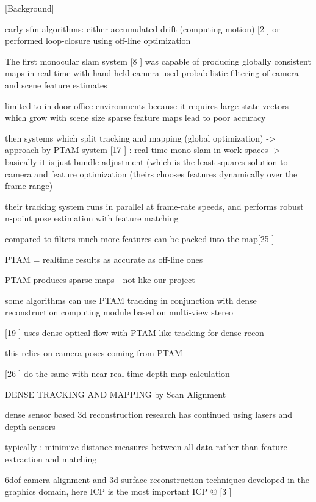 [Background]

early sfm algorithms: either accumulated drift (computing motion) [2 \cite{Beardsley97Sequential} ] or performed loop-closure using off-line optimization 

The first monocular slam system [8 \cite{Davison03Real} ] was capable of producing globally consistent maps in real time with hand-held camera used probabilistic filtering of camera and scene feature estimates

limited to in-door office environments because it requires large state vectors which grow with scene size
sparse feature maps lead to poor accuracy

then systems which split tracking and mapping (global optimization) -> approach by PTAM system [17 \cite{Klein07Parallel}]
: real time mono slam in work spaces -> basically it is just bundle adjustment (which is the least squares solution to camera and feature optimization (theirs chooses features dynamically over the frame range)

their tracking system runs in parallel at frame-rate speeds, and performs robust n-point pose estimation with feature matching

compared to filters much more features can be packed into the map[25 \cite{Strasdat10Real} ]

PTAM = realtime results as accurate as off-line ones

PTAM produces sparse maps - not like our project

some algorithms can use PTAM tracking in conjunction with dense reconstruction computing module based on multi-view stereo

[19 \cite{Newcombe10Live}] uses dense optical flow with PTAM like tracking for dense recon

this relies on camera poses coming from PTAM

[26 \cite{Stuhmer10Real}] do the same with near real time depth map calculation

DENSE TRACKING AND MAPPING by Scan Alignment

dense sensor based 3d reconstruction research has continued using lasers and depth sensors

typically : minimize distance measures between all data rather than feature extraction and matching

6dof camera alignment and 3d surface reconstruction techniques developed in the graphics domain, here ICP is the most important
ICP @ [3 \cite{Besl92Method} ]

